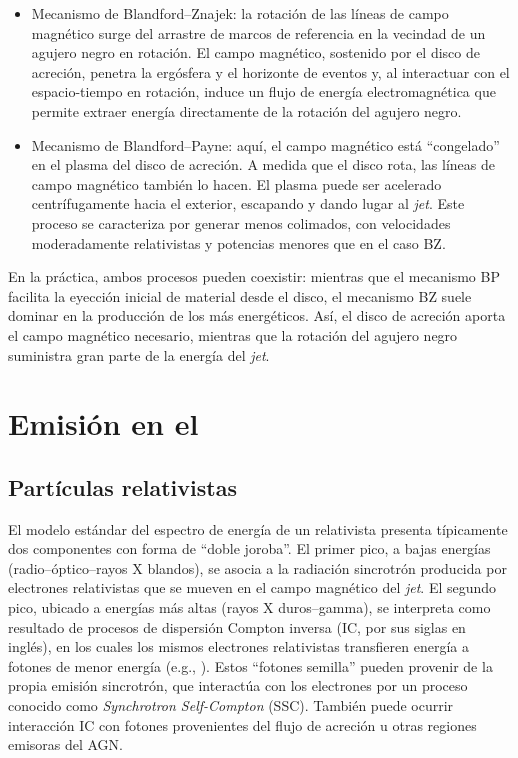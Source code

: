 \begin{itemize}
\item {Mecanismo de Blandford–Znajek:}  la rotación de las líneas de campo magnético surge del arrastre de marcos de referencia en la vecindad de un agujero negro en rotación.
	El campo magnético, sostenido por el disco de acreción, penetra la ergósfera y el horizonte de eventos y, al interactuar con el espacio-tiempo en rotación, induce un flujo de energía electromagnética que permite extraer energía directamente de la rotación del agujero negro.
\item {Mecanismo de Blandford–Payne:} aquí, el campo magnético está “congelado” en el plasma del disco de acreción.
	A medida que el disco rota, las líneas de campo magnético también lo hacen.
	El plasma puede ser acelerado centrífugamente hacia el exterior, escapando y dando lugar al \textit{jet}.
	Este proceso se caracteriza por generar \jets menos colimados, con velocidades moderadamente relativistas y potencias menores que en el caso BZ.
\end{itemize}

	En la práctica, ambos procesos pueden coexistir: mientras que el mecanismo BP facilita la eyección inicial de material desde el disco, el mecanismo BZ suele dominar en la producción de los \jets más energéticos.
	Así, el disco de acreción aporta el campo magnético necesario, mientras que la rotación del agujero negro suministra gran parte de la energía del \textit{jet}.
%
\section{Emisi\'on en el \jet}

\subsection{Partículas relativistas}

	El modelo estándar del espectro de energía de un \jet relativista presenta típicamente dos componentes con forma de ``doble joroba''.
	El primer pico, a bajas energías (radio–óptico–rayos X blandos), se asocia a la radiación sincrotrón producida por electrones relativistas que se mueven en el campo magnético del \textit{jet}.
	El segundo pico, ubicado a energías más altas (rayos X duros–gamma), se interpreta como resultado de procesos de dispersión Compton inversa (IC, por sus siglas en inglés), en los cuales los mismos electrones relativistas transfieren energía a fotones de menor energía (e.g., \citealt{1995PASP..107..803U, Ulrich1997}).
	Estos ``fotones semilla''  pueden provenir de la propia emisión sincrotrón, que interactúa con los electrones por un proceso conocido como \textit{Synchrotron Self-Compton} (SSC).
	También puede ocurrir interacción IC con fotones provenientes del flujo de acreción u otras regiones emisoras del AGN.

